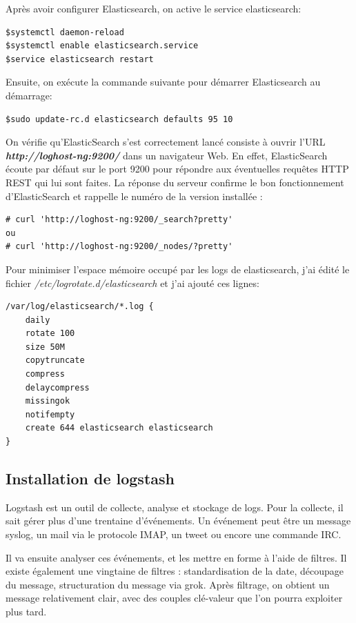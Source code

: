 \documentclass[11pt,a4paper]{article}
\begin{document}
Après avoir configurer Elasticsearch, on active le service elasticsearch:

\begin{verbatim}
$systemctl daemon-reload
$systemctl enable elasticsearch.service
$service elasticsearch restart
\end{verbatim}

Ensuite, on exécute la commande suivante pour démarrer Elasticsearch au démarrage:

\begin{verbatim}
$sudo update-rc.d elasticsearch defaults 95 10
\end{verbatim}

On vérifie qu'ElasticSearch s'est correctement lancé consiste à ouvrir l'URL\textit{ \textbf{http://loghost-ng:9200/}} dans un navigateur Web. En effet, ElasticSearch écoute par défaut sur le port 9200 pour répondre aux éventuelles requêtes HTTP REST qui lui sont faites.
La réponse du serveur confirme le bon fonctionnement d'ElasticSearch et rappelle le numéro de la version installée :
\begin{verbatim}
# curl 'http://loghost-ng:9200/_search?pretty'
ou
# curl 'http://loghost-ng:9200/_nodes/?pretty'
\end{verbatim}

Pour minimiser l'espace mémoire occupé par les logs de elasticsearch, j'ai édité le fichier \textit{/etc/logrotate.d/elasticsearch } et j'ai ajouté ces lignes:
\begin{verbatim}
/var/log/elasticsearch/*.log {
    daily
    rotate 100
    size 50M
    copytruncate
    compress
    delaycompress
    missingok
    notifempty
    create 644 elasticsearch elasticsearch
}
\end{verbatim}

\subsection{Installation de logstash}
Logstash est un outil de collecte, analyse et stockage de logs. Pour la collecte, il sait gérer plus d'une trentaine d'événements. Un événement peut être un message syslog, un mail via le protocole IMAP, un tweet ou encore une commande IRC.

Il va ensuite analyser ces événements, et les mettre en forme à l'aide de filtres. Il existe également une vingtaine de filtres : standardisation de la date, découpage du message, structuration du message via grok.
Après filtrage, on obtient un message relativement clair, avec des couples clé-valeur que l'on pourra exploiter plus tard.
\end{document}
